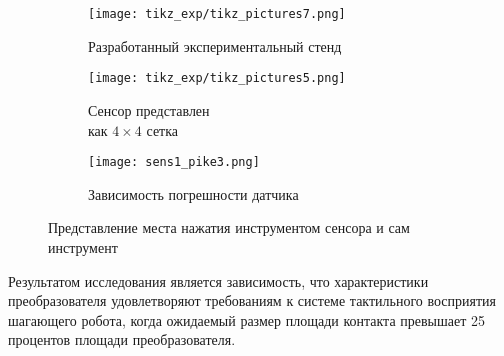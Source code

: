 \begin{figure}[h]
    \begin{subfigure}[t]{0.45\textwidth}
        \centering\texttt{[image: tikz\_exp/tikz\_pictures7.png]}
        \caption{Разработанный экспериментальный стенд}
        \label{fig:exp_standd}
    \end{subfigure}
    \begin{subfigure}[t]{0.24\textwidth}
        \centering\texttt{[image: tikz\_exp/tikz\_pictures5.png]}
        \caption{Сенсор представлен \\ как $4\times4$ сетка}
        \label{fig:sensor_grid}
    \end{subfigure}
    \begin{subfigure}[t]{0.3\textwidth}
        \centering\texttt{[image: sens1\_pike3.png]}
        \caption{Зависимость погрешности датчика}
        \label{fig:sens1_pike3}
    \end{subfigure}
    \caption{Представление места нажатия инструментом сенсора и сам инструмент}
\end{figure}




Результатом исследования является зависимость, что характеристики преобразователя удовлетворяют требованиям к системе тактильного восприятия шагающего робота, когда ожидаемый размер площади контакта превышает 25 процентов площади преобразователя.

